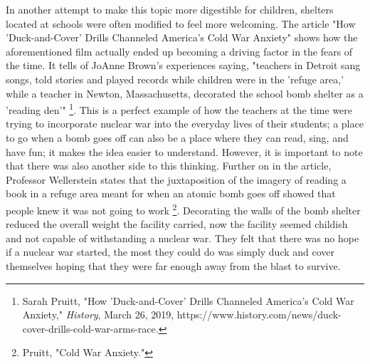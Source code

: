 \documentclass[12pt]{turabian-researchpaper}
\begin{document}
In another attempt to make this topic more digestible for children, shelters located at schools were often modified to feel more welcoming. The article "How 'Duck-and-Cover' Drills Channeled America's Cold War Anxiety" shows how the aforementioned film actually ended up becoming a driving factor in the fears of the time. It tells of JoAnne Brown's experiences saying, "teachers in Detroit sang songs, told stories and played records while children were in the 'refuge area,' while a teacher in Newton, Massachusetts, decorated the school bomb shelter as a 'reading den'" \footnote{Sarah Pruitt, "How 'Duck-and-Cover' Drills Channeled America's Cold War Anxiety," \textit{History}, March 26, 2019, https://www.history.com/news/duck-cover-drills-cold-war-arms-race.}. This is a perfect example of how the teachers at the time were trying to incorporate nuclear war into the everyday lives of their students; a place to go when a bomb goes off can also be a place where they can read, sing, and have fun; it makes the idea easier to understand. However, it is important to note that there was also another side to this thinking. Further on in the article, Professor Wellerstein states that the juxtaposition of the imagery of reading a book in a refuge area meant for when an atomic bomb goes off showed that people knew it was not going to work \footnote{Pruitt, "Cold War Anxiety."}. Decorating the walls of the bomb shelter reduced the overall weight the facility carried, now the facility seemed childish and not capable of withstanding a nuclear war. They felt that there was no hope if a nuclear war started, the most they could do was simply duck and cover themselves hoping that they were far enough away from the blast to survive.
\end{document}
